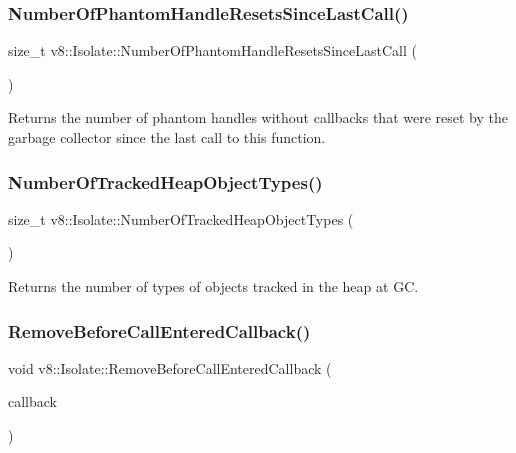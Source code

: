 \subsubsection{\texorpdfstring{Number\+Of\+Phantom\+Handle\+Resets\+Since\+Last\+Call()}{NumberOfPhantomHandleResetsSinceLastCall()}}
{\footnotesize\ttfamily size\+\_\+t v8\+::\+Isolate\+::\+Number\+Of\+Phantom\+Handle\+Resets\+Since\+Last\+Call (\begin{DoxyParamCaption}{ }\end{DoxyParamCaption})}

Returns the number of phantom handles without callbacks that were reset by the garbage collector since the last call to this function. \mbox{\label{classv8_1_1Isolate_a170044cddf655345682cb3c9b4bd1788}} 
\subsubsection{\texorpdfstring{Number\+Of\+Tracked\+Heap\+Object\+Types()}{NumberOfTrackedHeapObjectTypes()}}
{\footnotesize\ttfamily size\+\_\+t v8\+::\+Isolate\+::\+Number\+Of\+Tracked\+Heap\+Object\+Types (\begin{DoxyParamCaption}{ }\end{DoxyParamCaption})}

Returns the number of types of objects tracked in the heap at GC. \mbox{\label{classv8_1_1Isolate_a92be6cf5ce1e7360843794cc1528369f}} 
\subsubsection{\texorpdfstring{Remove\+Before\+Call\+Entered\+Callback()}{RemoveBeforeCallEnteredCallback()}}
{\footnotesize\ttfamily void v8\+::\+Isolate\+::\+Remove\+Before\+Call\+Entered\+Callback (\begin{DoxyParamCaption}\item[{Before\+Call\+Entered\+Callback}]{callback }\end{DoxyParamCaption})}

